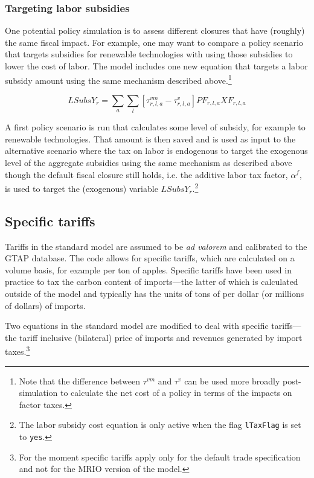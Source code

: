 \documentclass[11pt,letterpaper]{report}
\begin{document}
\subsubsection{Targeting labor subsidies}

One potential policy simulation is to assess different
closures that have (roughly) the same fiscal impact. For
example, one may want to compare a policy scenario that
targets subsidies for renewable technologies with using
those subsidies to lower the cost of labor.
The model includes one new equation that targets a
labor subsidy amount using the same mechanism described above.\footnote{Note
that the difference between $\tau^{\mathit{vm}}$ and $\tau^{\mathit{v}}$ can be used more broadly post-simulation to
calculate the net cost of a policy in terms of the impacts on
factor taxes.}

\[
\mathit{LSubsY}_r
= \sum_a{\sum_l {
\left[\tau^{\mathit{vm}}_{r,l,a} - \tau^{\mathit{v}}_{r,l,a}
\right] \mathit{PF}_{r,l,a} \mathit{XF}_{r,l,a}
}}
\]

A first policy scenario is run that calculates some
level of subsidy, for example to renewable technologies.
That amount is then saved and is used as input to the
alternative scenario where the tax on labor is
endogenous to target the exogenous level of the
aggregate subsidies using the same mechanism as described above
though the default fiscal closure still holds, i.e.
the additive labor tax factor, $\alpha^f$, is used to target
the (exogenous) variable $\mathit{LSubsY}_r$.\footnote{The
labor subsidy cost equation is only active when the flag
\texttt{lTaxFlag} is set to \texttt{yes}.}

\subsection{Specific tariffs}

Tariffs in the standard model are assumed to be
\emph{ad valorem} and calibrated to the GTAP database.
The code allows for specific tariffs, which are
calculated on a volume basis, for example per ton of apples.
Specific tariffs have been used in practice to tax the
carbon content of imports---the latter of which is calculated
outside of the model and typically has the units
of tons of \COT{} per dollar (or millions of dollars) of
imports.

Two equations in the standard model are modified to
deal with specific tariffs---the tariff inclusive (bilateral) price
of imports and revenues generated by import taxes.\footnote{For the moment specific tariffs apply only for the default trade
specification and not for the MRIO version of the model.}
\end{document}
